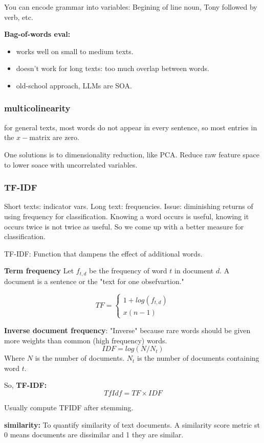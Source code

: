 \documentclass{article}
\begin{document}
You can encode grammar into variables: Begining of line noun, Tony followed by verb, etc.


\textbf{Bag-of-words eval:}
\begin{itemize}
\item works well on small to medium texts. 
\item doesn't work for long texts: too much overlap between words.
\item old-school approach, LLMs are SOA.
\end{itemize}

\subsubsection{multicolinearity}
for general texts, most words do not appear in every sentence, so most entries in the $x-$matrix are zero.

One solutions is to dimensionality reduction, like PCA. Reduce raw feature space to lower soace with uncorrelated variables.

\subsubsection{TF-IDF}
Short texts: indicator vars. Long text: frequencies.
Issue: diminishing returns of using frequency for classification. Knowing a word occurs is useful, knowing it occurs twice is not twice as useful. So we come up with a better measure for classification.

TF-IDF: Function that dampens the effect of additional words.

\textbf{Term frequency}
Let $f_{t,d}$ be the frequency of word $t$ in document $d$. A document is a sentence or the "text for one obsefvartion."

\[
TF = 
\begin{cases}
1+log(f_{t,d})\\
x(n-1)
\end{cases}
\]

\textbf{Inverse document frequency}: "Inverse" because rare words should be given more weights than common (high frequency) words.
\[
IDF = log(N/N_t)
\]
Where $N$ is the number of documents. $N_t$ is the number of documents containing word $t$.

So, \textbf{TF-IDF:}
\[
TfIdf = TF \times IDF
\]

Usually compute TFIDF after stemming.


\textbf{similarity:} To quantify similarity of text documents. A similarity score metric st 0 means documents are dissimilar and 1 they are similar.
\end{document}
